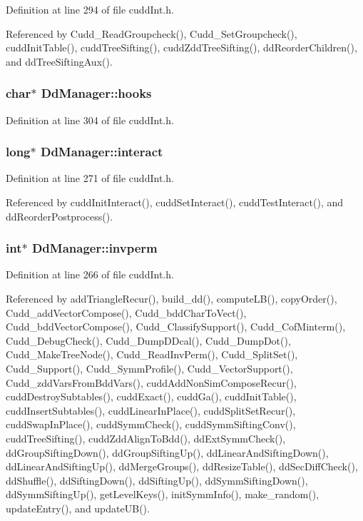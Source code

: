 Definition at line 294 of file cudd\-Int.h.

Referenced by Cudd\_\-Read\-Groupcheck(), Cudd\_\-Set\-Groupcheck(), cudd\-Init\-Table(), cudd\-Tree\-Sifting(), cudd\-Zdd\-Tree\-Sifting(), dd\-Reorder\-Children(), and dd\-Tree\-Sifting\-Aux().
\subsubsection{\setlength{\rightskip}{0pt plus 5cm}char$\ast$ \bf{Dd\-Manager::hooks}}\label{structDdManager_db322122f7a8874e4c0704fb1a022e00}




Definition at line 304 of file cudd\-Int.h.
\subsubsection{\setlength{\rightskip}{0pt plus 5cm}long$\ast$ \bf{Dd\-Manager::interact}}\label{structDdManager_3e336d3c8ce6bd8072611fadf25fe99b}




Definition at line 271 of file cudd\-Int.h.

Referenced by cudd\-Init\-Interact(), cudd\-Set\-Interact(), cudd\-Test\-Interact(), and dd\-Reorder\-Postprocess().
\subsubsection{\setlength{\rightskip}{0pt plus 5cm}int$\ast$ \bf{Dd\-Manager::invperm}}\label{structDdManager_8a017e5ed0025b952c284a41e5991b0f}




Definition at line 266 of file cudd\-Int.h.

Referenced by add\-Triangle\-Recur(), build\_\-dd(), compute\-LB(), copy\-Order(), Cudd\_\-add\-Vector\-Compose(), Cudd\_\-bdd\-Char\-To\-Vect(), Cudd\_\-bdd\-Vector\-Compose(), Cudd\_\-Classify\-Support(), Cudd\_\-Cof\-Minterm(), Cudd\_\-Debug\-Check(), Cudd\_\-Dump\-DDcal(), Cudd\_\-Dump\-Dot(), Cudd\_\-Make\-Tree\-Node(), Cudd\_\-Read\-Inv\-Perm(), Cudd\_\-Split\-Set(), Cudd\_\-Support(), Cudd\_\-Symm\-Profile(), Cudd\_\-Vector\-Support(), Cudd\_\-zdd\-Vars\-From\-Bdd\-Vars(), cudd\-Add\-Non\-Sim\-Compose\-Recur(), cudd\-Destroy\-Subtables(), cudd\-Exact(), cudd\-Ga(), cudd\-Init\-Table(), cudd\-Insert\-Subtables(), cudd\-Linear\-In\-Place(), cudd\-Split\-Set\-Recur(), cudd\-Swap\-In\-Place(), cudd\-Symm\-Check(), cudd\-Symm\-Sifting\-Conv(), cudd\-Tree\-Sifting(), cudd\-Zdd\-Align\-To\-Bdd(), dd\-Ext\-Symm\-Check(), dd\-Group\-Sifting\-Down(), dd\-Group\-Sifting\-Up(), dd\-Linear\-And\-Sifting\-Down(), dd\-Linear\-And\-Sifting\-Up(), dd\-Merge\-Groups(), dd\-Resize\-Table(), dd\-Sec\-Diff\-Check(), dd\-Shuffle(), dd\-Sifting\-Down(), dd\-Sifting\-Up(), dd\-Symm\-Sifting\-Down(), dd\-Symm\-Sifting\-Up(), get\-Level\-Keys(), init\-Symm\-Info(), make\_\-random(), update\-Entry(), and update\-UB().
